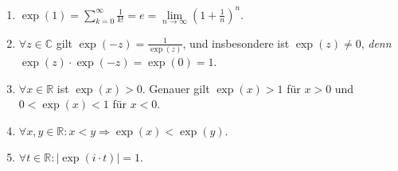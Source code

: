 \begin{enumerate}
    \item $\exp(1) = \sum\limits_{k=0}^\infty \frac{1}{k!} = e = \lim\limits_{n \to \infty} (1 + \frac{1}{n})^n$.
    \item $\forall z \in \mathbb{C}$ gilt $\exp(-z) = \frac{1}{\exp(z)}$, und insbesondere ist $\exp(z) \neq 0$, \textit{denn} $\exp(z) \cdot \exp(-z) = \exp(0) = 1$.
    \item $\forall x \in \mathbb{R}$ ist $\exp(x) > 0$. Genauer gilt $\exp(x) > 1$ für $x > 0$ und $0 < \exp(x) < 1$ für $x < 0$.
    \item $\forall x, y \in \mathbb{R}: x<y \Rightarrow \exp(x) < \exp(y)$.
    \item $\forall t \in \mathbb{R}: |\exp(i \cdot t)| = 1$.
\end{enumerate}